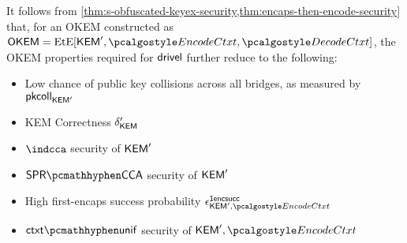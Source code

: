 \begin{corollary}
\label{cor:drivel-security-encaps-encode}
    It follows from \cref{thm:s-obfuscated-keyex-security,thm:encaps-then-encode-security} that, for an OKEM constructed as $\OKEM = \ete[\KEM', \encodectxt, \decodectxt]$, the OKEM properties required for $\textsf{drivel}$ further reduce to the following:
    \begin{itemize}
        \item Low chance of public key collisions across all bridges, as measured by $\mathsf{pkcoll}_{\mathsf{KEM}'}$
        \item KEM Correctness $\delta_{\mathsf{KEM}}'$
        \item $\indcca$ security of $\mathsf{KEM}'$
        \item $\sprcca$ security of $\mathsf{KEM}'$
        \item High first-encaps success probability $\epsilon^\firstencapssuccess_{\KEM',\encodectxt}$
        \item $\ctxtunif$ security of $\KEM',\encodectxt$
    \end{itemize}
\end{corollary}